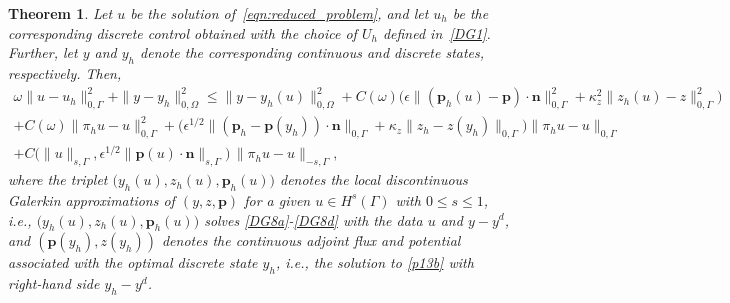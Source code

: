\documentclass[a4paper,10pt]{article}
\newcommand{\bp}{{\mathbf{p}}}
\newcommand{\bn}{{\mathbf{n}}}
\newtheorem{theorem}{Theorem}[section]
\numberwithin{theorem}{section}
\newcommand{\x}[2][blue]{#2}
\begin{document}
\begin{theorem}\label{thm:fully-discrete}
Let $u$ be the solution of~\eqref{eqn:reduced_problem}, and let
$u_h$ be the corresponding discrete control obtained with the choice of $U_h$ defined in~\eqref{DG1}.
Further, let $y$ and $y_h$ denote the corresponding \x{continuous and discrete states}, respectively. 
Then, 
\begin{multline}\label{gge}
    \omega \| u - u_h \|_{0,\Gamma}^2  + \|y-y_h\|_{0,\Omega}^2 \le \|y-y_h(u)\|_{0,\Omega}^2 + C(\omega) 
     \big( \epsilon\|(\bp_h(u) - \bp)\cdot \bn\|_{0,\Gamma}^2 
         + \kappa_z^2\|z_h(u) - z\|_{0,\Gamma}^2 \big)  \\ + C(\omega) \|\pi_hu-u\|_{0,\Gamma}^2 + \big(\epsilon^{1/2}\|(\bp_h - \bp(y_h))\cdot \bn\|_{0,\Gamma}+ \kappa_z\|z_h - z(y_h)\|_{0,\Gamma}\big)\|\pi_hu-u\|_{0,\Gamma}  \\ + C \big(\|u\|_{s,\Gamma}, \epsilon^{1/2}\|\bp(u)\cdot\bn\|_{s,\Gamma}\big)\,
       \|\pi_h u - u\|_{-s,\Gamma},
\end{multline}
where the triplet $\big(y_h(u), z_h(u),\bp_h(u)\big)$ denotes the local discontinuous Galerkin approximations of $(y,z,\bp)$ for a given $u\in H^s(\Gamma)$  with $0\le s\le 1$, i.e., $\big(y_h(u), z_h(u),\bp_h(u)\big)$ solves \eqref{DG8a}-\eqref{DG8d} with the data $u$ and $y-y^d$, and $(\bp(y_h),z(y_h))$ denotes the continuous adjoint flux and potential associated with the optimal discrete state $y_h$, i.e., the solution to \eqref{p13b} with right-hand side $y_h-y^d$.
\end{theorem}
\end{document}
